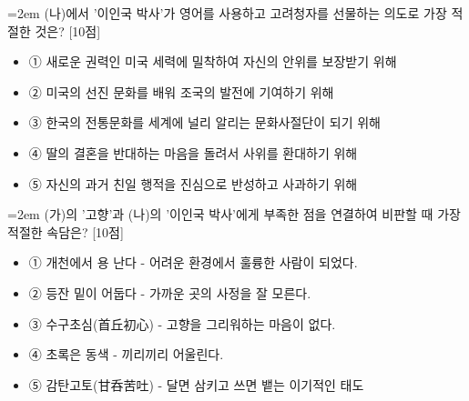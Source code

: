 \documentclass[11pt,a4paper]{article}
\newcommand{\qnum}[1]{%
  \tikz[baseline=(num.base)]{%
    \node[circle, fill=numCircle, text=white, inner sep=0pt,
          minimum size=18pt, font=\small\bfseries] (num) {#1};%
  }%
}
\newcommand{\pts}[1]{%
  \hfill\textcolor{ptsBadge}{[#1점]}%
}
\begin{document}
\vspace{4mm}
\begin{minipage}{\columnwidth}
{\hangindent=2em
\qnum{23}\enspace (나)에서 '이인국 박사'가 영어를 사용하고 고려청자를 선물하는 의도로 가장 적절한 것은? \pts{10}
\par}

\vspace{3mm}
\begin{itemize}[leftmargin=2.5em, labelsep=0.3em, label={}, itemsep=4pt, parsep=1pt, topsep=0pt]
  \item ① 새로운 권력인 미국 세력에 밀착하여 자신의 안위를 보장받기 위해
  \item ② 미국의 선진 문화를 배워 조국의 발전에 기여하기 위해
  \item ③ 한국의 전통문화를 세계에 널리 알리는 문화사절단이 되기 위해
  \item ④ 딸의 결혼을 반대하는 마음을 돌려서 사위를 환대하기 위해
  \item ⑤ 자신의 과거 친일 행적을 진심으로 반성하고 사과하기 위해
\end{itemize}
\end{minipage}
\vspace{4mm}

\vspace{4mm}
\begin{minipage}{\columnwidth}
{\hangindent=2em
\qnum{24}\enspace (가)의 '고향'과 (나)의 '이인국 박사'에게 부족한 점을 연결하여 비판할 때 가장 적절한 속담은? \pts{10}
\par}

\vspace{3mm}
\begin{itemize}[leftmargin=2.5em, labelsep=0.3em, label={}, itemsep=4pt, parsep=1pt, topsep=0pt]
  \item ① 개천에서 용 난다 - 어려운 환경에서 훌륭한 사람이 되었다.
  \item ② 등잔 밑이 어둡다 - 가까운 곳의 사정을 잘 모른다.
  \item ③ 수구초심(首丘初心) - 고향을 그리워하는 마음이 없다.
  \item ④ 초록은 동색 - 끼리끼리 어울린다.
  \item ⑤ 감탄고토(甘呑苦吐) - 달면 삼키고 쓰면 뱉는 이기적인 태도
\end{itemize}
\end{minipage}
\vspace{4mm}
\end{document}
